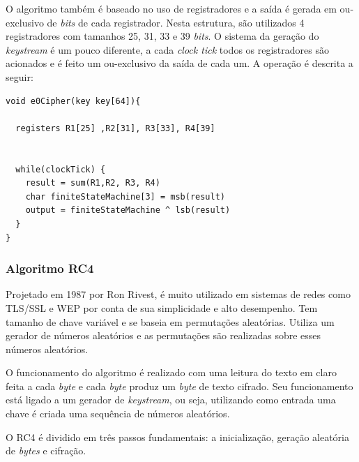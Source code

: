 O algoritmo também é baseado no uso de registradores e a saída é gerada em ou-exclusivo de \textit{bits} de cada registrador. Nesta estrutura, são utilizados 4 registradores com tamanhos 25, 31, 33 e 39 \textit{bits}. O sistema da geração do \textit{keystream} é um pouco diferente, a cada \textit{clock tick} todos os registradores são acionados e é feito um ou-exclusivo da saída de cada um. A operação é descrita a seguir:

\begin{lstlisting}[caption={Pseudo-código E0}, label=e0-pseudo-code]
void e0Cipher(key key[64]){

  registers R1[25] ,R2[31], R3[33], R4[39]


  while(clockTick) {
  	result = sum(R1,R2, R3, R4)
  	char finiteStateMachine[3] = msb(result)
  	output = finiteStateMachine ^ lsb(result)
  }
}
    \end{lstlisting}

\subsubsection{Algoritmo RC4}
\label{algorithm-rc4}

Projetado em 1987 por Ron Rivest, é muito utilizado em sistemas de redes como TLS/SSL e WEP por conta de sua simplicidade e alto desempenho. Tem tamanho de chave variável e se baseia em permutações aleatórias. Utiliza um gerador de números aleatórios e as permutações são realizadas sobre esses números aleatórios.

O funcionamento do algoritmo é realizado com uma leitura do texto em claro feita a cada \textit{byte} e cada \textit{byte} produz um \textit{byte} de texto cifrado. Seu funcionamento está ligado a um gerador de \textit{keystream}, ou seja, utilizando como entrada uma chave é criada uma sequência de números aleatórios.

O RC4 é dividido em três passos fundamentais: a inicialização, geração aleatória de \textit{bytes} e cifração.

